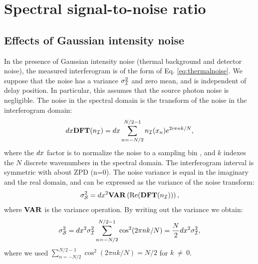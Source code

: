 \section{Spectral signal-to-noise ratio}
\label{sec:spectralSNR}

\subsection{Effects of Gaussian intensity noise}

In the presence of Gaussian intensity noise (thermal background and detector noise), the measured interferogram is of the form of Eq. \ref{eq:thermalnoise}. We suppose that the noise has a variance $\sigma_{\mathcal{I}}^2$ and zero mean, and is independent of delay position.  In particular, this assumes that the source photon noise is negligible.
The noise in the spectral domain is the transform of the noise in the interferogram domain:
\begin{equation}
dx\mathbf{DFT}(n_{\mathcal{I}}) =  dx\sum_{n=-N/2}^{N/2-1}n_{\mathcal{I}}(x_n)e^{2i\pi n k/N},
\end{equation}
where the $dx$ factor is to normalize the noise to a sampling bin \citep{Press:1992vya}, 
and $k$ indexes the $N$ discrete wavenumbers in the spectral domain.
The interferogram interval is symmetric with about ZPD (n=0). The noise variance is equal in the imaginary and the real domain, and can be expressed as the variance of the noise transform:
\begin{equation}
\sigma_\mathcal{S}^2 = dx^2\mathbf{VAR}\left(\textrm{Re}(\mathbf{DFT}(n_{\mathcal{I}}))\right),
\end{equation}
where $\mathbf{VAR}$ is the variance operation. By writing out the variance we obtain:
\begin{equation}
\sigma_\mathcal{S}^2 = dx^2\sigma_{\mathcal{I}}^2\sum_{n=-N/2}^{N/2-1}\cos^2(2\pi nk/N) =\frac{N}{2}dx^2\sigma_{\mathcal{I}}^2 ,
\end{equation}
where we used $\sum_{n=-N/2}^{N/2-1}\cos^2(2\pi nk/N) = N/2$ for $k~\neq~0$. 

